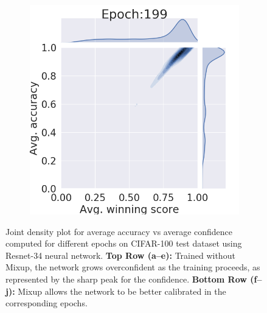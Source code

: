 \begin{figure}[htb]
\begin{subfigure}[b]{0.19\textwidth}
         \caption{}
     \end{subfigure}
     \hfill
     \begin{subfigure}[b]{0.19\textwidth}
         \centering
         \noindent\includegraphics[width=\textwidth]{images/joint_plot/mixup/199.png}
         \caption{}
     \end{subfigure}
        \caption{Joint density plot for average accuracy vs average confidence computed for different epochs on CIFAR-100 test dataset using Resnet-34 neural network. \textbf{Top Row (a--e):} Trained without Mixup, the network grows overconfident as the training proceeds, as represented by the sharp peak for the confidence. \textbf{Bottom Row (f--j):} Mixup allows the network to be better calibrated in the corresponding epochs.}
        \label{fig:hypothesis}
\end{figure}


